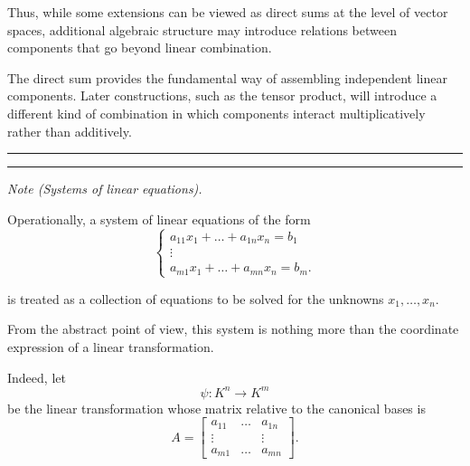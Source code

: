 \medskip

Thus, while some extensions can be viewed as direct sums at the level of
vector spaces, additional algebraic structure may introduce relations
between components that go beyond linear combination.

\medskip

The direct sum provides the fundamental way of assembling independent
linear components.
Later constructions, such as the tensor product, will introduce a different
kind of combination in which components interact multiplicatively rather
than additively.
\medskip
\hrule
\bigskip


\bigskip
\hrule
\medskip

\textit{Note (Systems of linear equations).}

Operationally, a system of linear equations of the form
\[
\begin{cases}
a_{11} x_1 + \dots + a_{1n} x_n = b_1\\
\vdots\\
a_{m1} x_1 + \dots + a_{mn} x_n = b_m.
\end{cases}
\]

is treated as a collection of equations to be solved for the unknowns
\(
x_1,\dots,x_n.
\)

\medskip

From the abstract point of view, this system is nothing more than the coordinate expression of a linear transformation.

\medskip

Indeed, let
\[
\psi : K^n \longrightarrow K^m
\]
be the linear transformation whose matrix relative to the canonical bases is
\[
A =
\begin{bmatrix}
a_{11} & \dots & a_{1n}\\
\vdots & & \vdots\\
a_{m1} & \dots & a_{mn}
\end{bmatrix}.
\]

